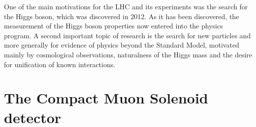 One of the main motivations for the LHC and its experiments was the search for the Higgs boson, which was discovered in 2012. As it has been discovered, the measurement of the Higgs boson properties now entered into the physics program. A second important topic of research is the search for new particles and more generally for evidence of physics beyond the Standard Model, motivated mainly by cosmological observations, naturalness of the Higgs mass and the desire for unification of known interactions.

\newpage


\section{The Compact Muon Solenoid detector~\label{sec:CMS}}


